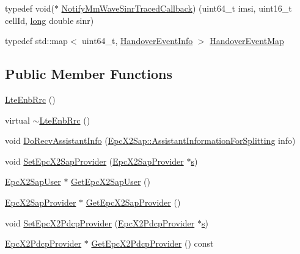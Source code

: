\begin{DoxyCompactItemize}
\item 
typedef void($\ast$ \hyperlink{classns3_1_1LteEnbRrc_a7ac5ec9da463b805e6e2701c9f603913}{Notify\+Mm\+Wave\+Sinr\+Traced\+Callback}) (uint64\+\_\+t imsi, uint16\+\_\+t cell\+Id, \hyperlink{generate__test__data__lte__sinr_8m_a0eab6be67e93c3411f7a8b53cc297285}{long} double sinr)
\item 
typedef std\+::map$<$ uint64\+\_\+t, \hyperlink{structns3_1_1LteEnbRrc_1_1HandoverEventInfo}{Handover\+Event\+Info} $>$ \hyperlink{classns3_1_1LteEnbRrc_a339e378e7ccb6a59a9b32c673e453036}{Handover\+Event\+Map}
\end{DoxyCompactItemize}
\subsection*{Public Member Functions}
\begin{DoxyCompactItemize}
\item 
\hyperlink{classns3_1_1LteEnbRrc_a28603f43a736c5d9fab4831670fd4c7a}{Lte\+Enb\+Rrc} ()
\item 
virtual \hyperlink{classns3_1_1LteEnbRrc_a2095f02f2282051a0dd49dee2f9937e6}{$\sim$\+Lte\+Enb\+Rrc} ()
\item 
void \hyperlink{classns3_1_1LteEnbRrc_a148d75ce9aa12635f07cd05dacad77a6}{Do\+Recv\+Assistant\+Info} (\hyperlink{structns3_1_1EpcX2Sap_1_1AssistantInformationForSplitting}{Epc\+X2\+Sap\+::\+Assistant\+Information\+For\+Splitting} info)
\item 
void \hyperlink{classns3_1_1LteEnbRrc_afd74dedc3b81b6ef99de78325364b3a1}{Set\+Epc\+X2\+Sap\+Provider} (\hyperlink{classns3_1_1EpcX2SapProvider}{Epc\+X2\+Sap\+Provider} $\ast$\hyperlink{generate__test__data__lte__sinr_8m_ad83eeb3a142285d1243a08c6b7026df8}{s})
\item 
\hyperlink{classns3_1_1EpcX2SapUser}{Epc\+X2\+Sap\+User} $\ast$ \hyperlink{classns3_1_1LteEnbRrc_aa73e66235973a8e24aaef014cc3a4939}{Get\+Epc\+X2\+Sap\+User} ()
\item 
\hyperlink{classns3_1_1EpcX2SapProvider}{Epc\+X2\+Sap\+Provider} $\ast$ \hyperlink{classns3_1_1LteEnbRrc_adfa0a87b2f57b349bf0330e2ea41efbc}{Get\+Epc\+X2\+Sap\+Provider} ()
\item 
void \hyperlink{classns3_1_1LteEnbRrc_acbe13eda147167428987674848020bc5}{Set\+Epc\+X2\+Pdcp\+Provider} (\hyperlink{classns3_1_1EpcX2PdcpProvider}{Epc\+X2\+Pdcp\+Provider} $\ast$\hyperlink{generate__test__data__lte__sinr_8m_ad83eeb3a142285d1243a08c6b7026df8}{s})
\item 
\hyperlink{classns3_1_1EpcX2PdcpProvider}{Epc\+X2\+Pdcp\+Provider} $\ast$ \hyperlink{classns3_1_1LteEnbRrc_ab00f1f266e3a82b5b7ade035f7c316a8}{Get\+Epc\+X2\+Pdcp\+Provider} () const 

\end{DoxyCompactItemize}
